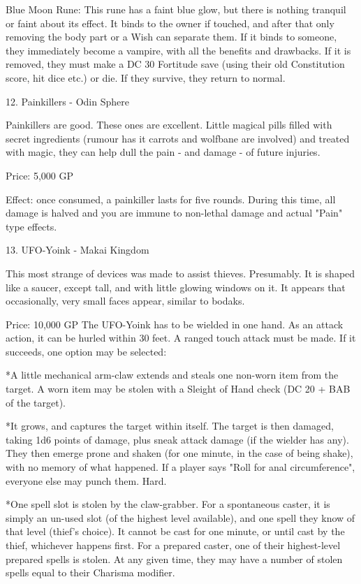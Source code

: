 \begin{multicols}{2}
Blue Moon Rune: This rune has a faint blue glow, but there is nothing tranquil or faint about its effect. It binds to the owner if touched, and after that only removing the body part or a Wish can separate them. If it binds to someone, they immediately become a vampire, with all the benefits and drawbacks. If it is removed, they must make a DC 30 Fortitude save (using their old Constitution score, hit dice etc.) or die. If they survive, they return to normal.


12. Painkillers - Odin Sphere

Painkillers are good. These ones are excellent. Little magical pills filled with secret ingredients (rumour has it carrots and wolfbane are involved) and treated with magic, they can help dull the pain - and damage - of future injuries.

Price: 5,000 GP

Effect: once consumed, a painkiller lasts for five rounds. During this time, all damage is halved and you are immune to non-lethal damage and actual "Pain" type effects.


13. UFO-Yoink - Makai Kingdom

This most strange of devices was made to assist thieves. Presumably. It is shaped like a saucer, except tall, and with little glowing windows on it. It appears that occasionally, very small faces appear, similar to bodaks.

Price: 10,000 GP
The UFO-Yoink has to be wielded in one hand. As an attack action, it can be hurled within 30 feet. A ranged touch attack must be made. If it succeeds, one option may be selected:

*A little mechanical arm-claw extends and steals one non-worn item from the target. A worn item may be stolen with a Sleight of Hand check (DC 20 + BAB of the target).

*It grows, and captures the target within itself. The target is then damaged, taking 1d6 points of damage, plus sneak attack damage (if the wielder has any). They then emerge prone and shaken (for one minute, in the case of being shake), with no memory of what happened. If a player says "Roll for anal circumference", everyone else may punch them. Hard.

*One spell slot is stolen by the claw-grabber. For a spontaneous caster, it is simply an un-used slot (of the highest level available), and one spell they know of that level (thief's choice). It cannot be cast for one minute, or until cast by the thief, whichever happens first. For a prepared caster, one of their highest-level prepared spells is stolen. At any given time, they may have a number of stolen spells equal to their Charisma modifier. 



\end{multicols}
